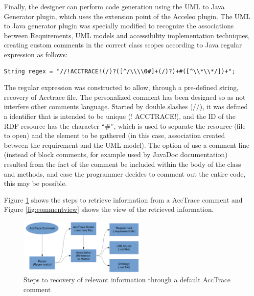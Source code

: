\documentclass[10pt, conference, compsocconf]{IEEEtran}
\begin{document}
Finally, the designer can perform code generation using the UML to Java Generator plugin, which uses the extension point of the Acceleo plugin.
The UML to Java generator plugin was specially modified to recognize the associations between Requirements, UML models and accessibility implementation techniques, creating custom comments in the correct class scopes according to Java regular expression as follows:

\medskip

\noindent
\begin{verbatim}
String regex = "//!ACCTRACE!(/)?([^/\\\\0#]+(/)?)+#([^\\*\\*/])+";
\end{verbatim}
%
\noindent

The regular expression was constructed to allow, through a pre-defined string, recovery of Acctrace file. The personalized 
comment has been designed so as not interfere other
comments language. Started by double slashes (//), it was defined a
identifier that is intended to be unique (! ACCTRACE!), and the ID of the RDF resource has the character ``\#'', which is used to separate 
the resource (file to open) and the element to be gathered (in this case,
association created between the requirement and the UML model). The option of
use a comment line (instead of block comments, for example used by JavaDoc documentation) resulted from the fact
of the comment be included within the body of the class and methods, and case
the programmer decides to comment out the entire code, this may be possible. 

Figure \ref{fig:commentrecovery} shows the steps to retrieve information from a AccTrace comment and Figure \ref{fig:commentview}
shows the view of the retrieved information.


\begin{figure}[!t]
\centering
\includegraphics[width=2.5in]{./img/commentrecovery.png}
\caption{Steps to recovery of relevant information through a
default AccTrace comment}
\label{fig:commentrecovery}
\end{figure} 
\end{document}
